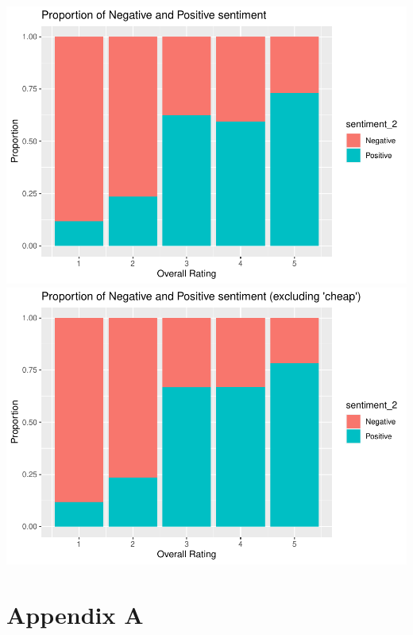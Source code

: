 \documentclass[
  11pt,
]{article}
\begin{document}
\includegraphics[width=0.5\linewidth]{Assignment-STAT702---final_files/figure-latex/3b comparison,figures-side-1}
\includegraphics[width=0.5\linewidth]{Assignment-STAT702---final_files/figure-latex/3b comparison,figures-side-2}

\hypertarget{appendix-a}{%
\section{Appendix A}\label{appendix-a}}
\end{document}
